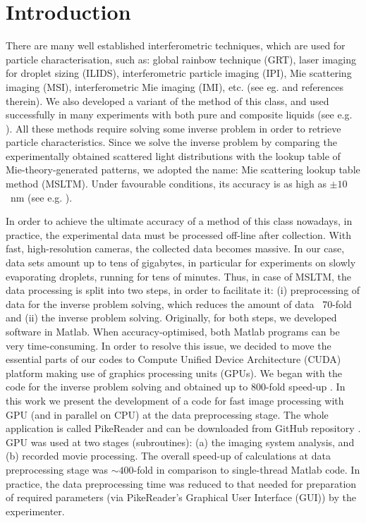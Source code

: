 \documentclass[preprint,review,12pt,dvips]{elsarticle}
\begin{document}
\section{Introduction}
		There are many well established interferometric techniques, which are used for particle characterisation, such as: global
	rainbow technique (GRT), laser imaging for droplet sizing (ILIDS), interferometric particle imaging (IPI), Mie scattering
	imaging (MSI), interferometric Mie imaging (IMI), etc. (see eg. \cite{Dehaeck} and references therein). We also developed
	a variant of the method of this class, and used successfully in many experiments with both pure and composite liquids (see
	e.g. \cite{N2andAir,liquids,RoP,weightvsscatt,Hi-precission}). All these methods require solving some inverse problem in
	order to retrieve particle characteristics. Since we solve the inverse problem by comparing the experimentally obtained
	scattered light distributions with the lookup table of Mie-theory-generated patterns, we adopted the name: Mie scattering
	lookup table method (MSLTM). Under favourable conditions, its accuracy is as high as $\pm 10$~nm (see e.g.
	\cite{Hi-precission}).

		In order to achieve the ultimate accuracy of a method of this class nowadays, in practice, the experimental data must be
	processed off-line after collection. With fast, high-resolution cameras, the collected data becomes massive. In our case,
	data sets amount up to tens of gigabytes, in particular for experiments on slowly evaporating droplets, running for tens
	of minutes. Thus, in case of MSLTM, the data processing is split into two steps, in order to facilitate it: (i)
	preprocessing of data for the inverse problem solving, which reduces the amount of data ~70-fold and (ii) the inverse
	problem solving. Originally, for both steps, we developed software in Matlab. When accuracy-optimised, both Matlab
	programs can be very time-consuming. In order to resolve this issue, we decided to move the essential parts of our codes
	to Compute Unified Device Architecture (CUDA) platform making use of graphics processing units (GPUs). We began with the
	code for the inverse problem solving and obtained up to 800-fold speed-up \cite{Smigacz}. In this work we present the
	development of a code for fast image processing with GPU (and in parallel on CPU) at the data preprocessing stage. The
	whole application is called PikeReader and can be downloaded from GitHub repository \cite{PikeReader}. GPU was used at two
	stages (subroutines): (a) the imaging system analysis, and (b) recorded movie processing. The overall speed-up of
	calculations at data preprocessing stage was $\sim 400$-fold in comparison to single-thread Matlab code. In practice, the
	data preprocessing time was reduced to that needed for preparation of required parameters (via PikeReader's Graphical User
	Interface (GUI)) by the experimenter.
\end{document}
